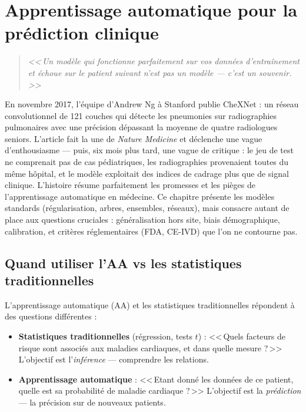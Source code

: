 \chapter{Apprentissage automatique pour la pr\'ediction clinique}
\label{ch:ml-clinique}

\begin{quote}
\emph{<<\,Un mod\`ele qui fonctionne parfaitement sur vos donn\'ees d'entra\^inement et \'echoue sur le patient suivant n'est pas un mod\`ele --- c'est un souvenir.\,>>}
\end{quote}

En novembre 2017, l'équipe d'Andrew Ng à Stanford publie CheXNet : un réseau convolutionnel de 121 couches qui détecte les pneumonies sur radiographies pulmonaires avec une précision dépassant la moyenne de quatre radiologues seniors. L'article fait la une de \emph{Nature Medicine} et déclenche une vague d'enthousiasme --- puis, six mois plus tard, une vague de critique : le jeu de test ne comprenait pas de cas pédiatriques, les radiographies provenaient toutes du même hôpital, et le modèle exploitait des indices de cadrage plus que de signal clinique. L'histoire résume parfaitement les promesses et les pièges de l'apprentissage automatique en médecine. Ce chapitre présente les modèles standards (régularisation, arbres, ensembles, réseaux), mais consacre autant de place aux questions cruciales : généralisation hors site, biais démographique, calibration, et critères réglementaires (FDA, CE-IVD) que l'on ne contourne pas.

\section{Quand utiliser l'AA vs les statistiques traditionnelles}

L'apprentissage automatique (AA) et les statistiques traditionnelles r\'epondent \`a des questions diff\'erentes :

\begin{itemize}
  \item \textbf{Statistiques traditionnelles} (r\'egression, tests $t$) : <<\,Quels facteurs de risque sont associ\'es aux maladies cardiaques, et dans quelle mesure ?\,>> L'objectif est l'\emph{inf\'erence} --- comprendre les relations.
  \item \textbf{Apprentissage automatique} : <<\,Etant donn\'e les donn\'ees de ce patient, quelle est sa probabilit\'e de maladie cardiaque ?\,>> L'objectif est la \emph{pr\'ediction} --- la pr\'ecision sur de nouveaux patients.
\end{itemize}

